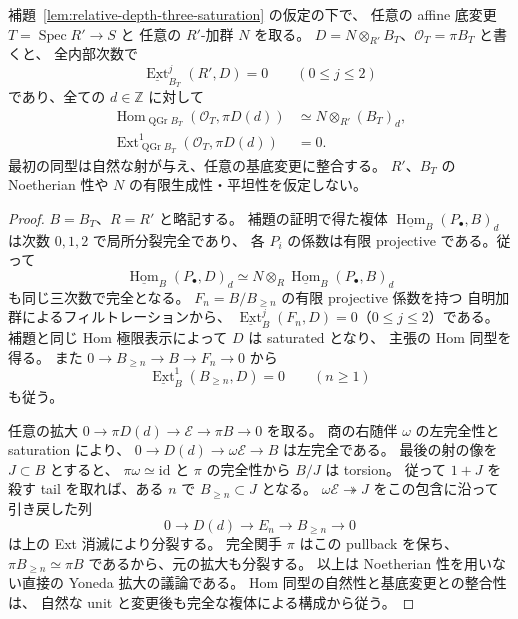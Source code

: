 \begin{corollary}[任意の係数加群に対する切断と一次コホモロジー]
\label{cor:relative-depth-three-coefficients}
補題~\ref{lem:relative-depth-three-saturation} の仮定の下で、
任意の affine 底変更 $T=\operatorname{Spec}R'\to S$ と
任意の $R'$-加群 $N$ を取る。
$D=N\otimes_{R'}B_T$、$\mathcal O_T=\pi B_T$ と書くと、
全内部次数で
\[
 \underline{\operatorname{Ext}}_{B_T}^{j}(R',D)=0
 \qquad(0\le j\le2)
\]
であり、全ての $d\in\mathbb Z$ に対して
\begin{align*}
 \operatorname{Hom}_{\operatorname{QGr}B_T}
    (\mathcal O_T,\pi D(d))
       &\simeq N\otimes_{R'}(B_T)_d,\\
 \operatorname{Ext}^{1}_{\operatorname{QGr}B_T}
    (\mathcal O_T,\pi D(d))&=0.
\end{align*}
最初の同型は自然な射が与え、任意の基底変更に整合する。
$R'$、$B_T$ の Noetherian 性や $N$ の有限生成性・平坦性を仮定しない。
\end{corollary}
\begin{proof}
$B=B_T$、$R=R'$ と略記する。
補題の証明で得た複体
$\underline{\operatorname{Hom}}_B(P_\bullet,B)_d$
は次数 $0,1,2$ で局所分裂完全であり、
各 $P_i$ の係数は有限 projective である。従って
\[
 \underline{\operatorname{Hom}}_B(P_\bullet,D)_d
 \simeq N\otimes_R
       \underline{\operatorname{Hom}}_B(P_\bullet,B)_d
\]
も同じ三次数で完全となる。
$F_n=B/B_{\ge n}$ の有限 projective 係数を持つ
自明加群によるフィルトレーションから、
$\underline{\operatorname{Ext}}_B^j(F_n,D)=0$（$0\le j\le2$）である。
補題と同じ Hom 極限表示によって $D$ は saturated となり、
主張の Hom 同型を得る。
また $0\to B_{\ge n}\to B\to F_n\to0$ から
\[
 \underline{\operatorname{Ext}}_B^1(B_{\ge n},D)=0
 \qquad(n\ge1)
\]
も従う。

任意の拡大
$0\to\pi D(d)\to\mathcal E\to\pi B\to0$ を取る。
商の右随伴 $\omega$ の左完全性と saturation により、
$0\to D(d)\to\omega\mathcal E\to B$ は左完全である。
最後の射の像を $J\subset B$ とすると、
$\pi\omega\simeq\mathrm{id}$ と $\pi$ の完全性から $B/J$ は torsion。
従って $1+J$ を殺す tail を取れば、ある $n$ で $B_{\ge n}\subset J$ となる。
$\omega\mathcal E\twoheadrightarrow J$ をこの包含に沿って引き戻した列
\[
 0\longrightarrow D(d)\longrightarrow E_n
       \longrightarrow B_{\ge n}\longrightarrow0
\]
は上の Ext 消滅により分裂する。
完全関手 $\pi$ はこの pullback を保ち、
$\pi B_{\ge n}\simeq\pi B$ であるから、元の拡大も分裂する。
以上は Noetherian 性を用いない直接の Yoneda 拡大の議論である。
Hom 同型の自然性と基底変更との整合性は、
自然な unit と変更後も完全な複体による構成から従う。
\end{proof}

